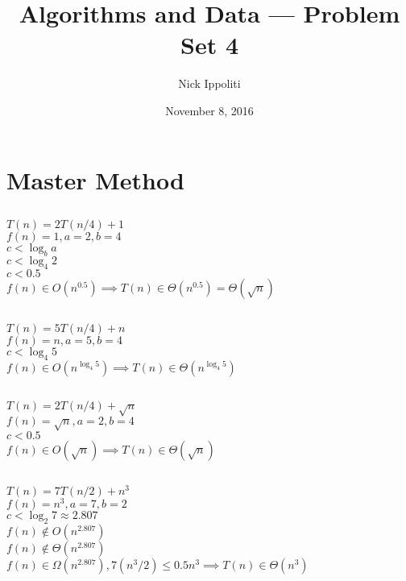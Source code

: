 \documentclass[14pt, letterpaper]{article}
\title{Algorithms and Data --- Problem Set 4}
\author{Nick Ippoliti}
\date{November 8, 2016}
\begin{document}
\begin{titlepage}
\maketitle
\end{titlepage}

\section{Master Method}
\subsection{}
$T(n) = 2T(n/4) + 1$ \\
$f(n) = 1, a = 2, b = 4$ \\
$c < \log_b a$\\
$c < \log_4 2$\\
$c < 0.5$\\
$f(n) \in O(n^{0.5}) \implies T(n) \in \Theta(n^{0.5}) = \Theta(\sqrt{n})$

\subsection{}
$T(n) = 5T(n/4) + n$ \\
$f(n) = n, a = 5, b = 4$ \\
$c < \log_4 5$ \\
$f(n) \in O(n^{\log_4 5}) \implies T(n) \in \Theta(n^{\log_4 5})$

\subsection{}
$T(n) = 2T(n/4) + \sqrt{n}$ \\
$f(n) = \sqrt{n}, a = 2, b = 4$ \\
$c < 0.5$ \\
$f(n) \in O(\sqrt{n}) \implies T(n) \in \Theta(\sqrt{n})$

\subsection{}
$T(n) = 7T(n/2) + n^3$ \\
$f(n) = n^3, a = 7, b = 2$ \\
$c < \log_2 7 \approx 2.807$ \\
$f(n) \notin O(n^{2.807})$ \\
$f(n) \notin \Theta(n^{2.807})$ \\
$f(n) \in \Omega(n^{2.807}), 7(n^3/2) \leq 0.5n^3 \implies T(n) \in \Theta(n^3)$
\end{document}
